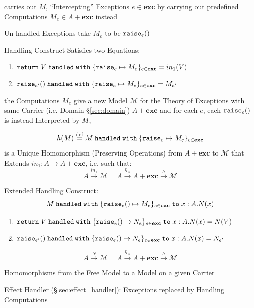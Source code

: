 carries out $M$, ``Intercepting'' Exceptions $e \in \mathbf{exc}$ by carrying
out predefined Computations $M_e \in A + \mathbf{exc}$ instead

Un-handled Exceptions take $M_e$ to be $\mathtt{raise}_e()$

Handling Construct Satisfies two Equations:
\begin{enumerate}
  \item $\mathtt{return}\; V \;\mathtt{handled\;with}\;
    \{\mathtt{raise}_e \mapsto M_e\}_{e \in \mathbf{exc}}
    = in_1(V)$
  \item $\mathtt{raise}_{e'}() \;\mathtt{handled\;with}\;
    \{\mathtt{raise}_e \mapsto M_e\}_{e \in \mathbf{exc}}
    = M_{e'}$
\end{enumerate}

the Computations $M_e$ give a new Model $\mathcal{M}$ for the Theory of
Exceptions with same Carrier (i.e. Domain \S\ref{sec:domain}) $A + \mathbf{exc}$
and for each $e$, each $\mathtt{raise}_e ()$ is instead Interpreted by $M_e$

\[
  h(M) \stackrel{\mathrm{def}}= M \;\mathtt{handled\;with}\;
    \{\mathtt{raise}_e \mapsto M_e\}_{e \in \mathbf{exc}}
\]
is a Unique Homomorphism (Preserving Operations) from $A + \mathbf{exc}$ to
$\mathcal{M}$ that Extends $in_1 : A \rightarrow A + \mathbf{exc}$, i.e. such
that:
\[
  A \xrightarrow{in_1} \mathcal{M} =
    A \xrightarrow{\eta_A} A + \mathbf{exc} \xrightarrow{h} \mathcal{M}
\]

Extended Handling Construct:
\[
  M \;\mathtt{handled\;with}\;
    \{\mathtt{raise}_e() \mapsto M_e \}_{e\in\mathbf{exc}}
    \;\mathtt{to}\; x : A.N(x)
\]

\begin{enumerate}
  \item $\mathtt{return}\; V \;\mathtt{handled\;with}\;
    \{\mathtt{raise}_e() \mapsto N_e\}_{e \in \mathbf{exc}}
    \;\mathtt{to}\; x:A.N(x)
    = N(V)$
  \item $\mathtt{raise}_{e'}() \;\mathtt{handled\;with}\;
    \{\mathtt{raise}_e() \mapsto N_e\}_{e \in \mathbf{exc}}
    \;\mathtt{to}\; x:A.N(x)
    = N_{e'}$
\end{enumerate}
\[
  A \xrightarrow{N} \mathcal{M} =
    A \xrightarrow{\eta_A} A + \mathbf{exc} \xrightarrow{h} \mathcal{M}
\]

Homomorphisms from the Free Model to a Model on a given Carrier

Effect Handler (\S\ref{sec:effect_handler}): Exceptions replaced by
Handling Computations




